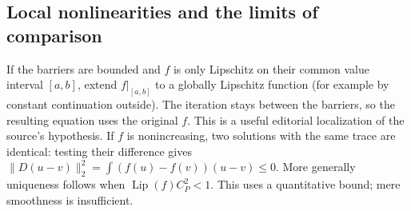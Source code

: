 \subsection{Local nonlinearities and the limits of comparison}
If the barriers are bounded and $f$ is only Lipschitz on their common
value interval $[a,b]$, extend $f|_{[a,b]}$ to a globally Lipschitz
function (for example by constant continuation outside). The iteration
stays between the barriers, so the resulting equation uses the original
$f$. This is a useful editorial localization of the source's hypothesis.
\Needspace{42mm}
If $f$ is nonincreasing, two solutions with the same trace are identical:
testing their difference gives
$\|D(u-v)\|_2^2=\int(f(u)-f(v))(u-v)\leq0$.
More generally uniqueness follows when $\operatorname{Lip}(f)C_P^2<1$.
This uses a quantitative bound; mere smoothness is insufficient.

